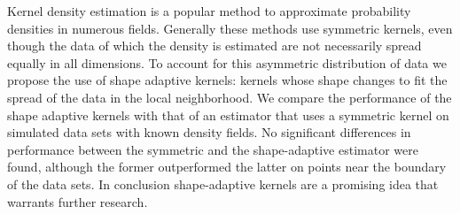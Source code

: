 \noindent Kernel density estimation is a popular method to approximate probability densities in numerous fields.
Generally these methods use symmetric kernels, even though the data of which the density is estimated are not necessarily spread equally in all dimensions. To account for this asymmetric distribution of data we propose the use of shape adaptive kernels: kernels whose shape changes to fit the spread of the data in the local neighborhood.
We compare the performance of the shape adaptive kernels with that of an estimator that uses a symmetric kernel on simulated data sets with known density fields.
No significant differences in performance between the symmetric and the shape-adaptive estimator were found, although the former outperformed the latter on points near the boundary of the data sets.  
In conclusion shape-adaptive kernels are a promising idea that warrants further research.

